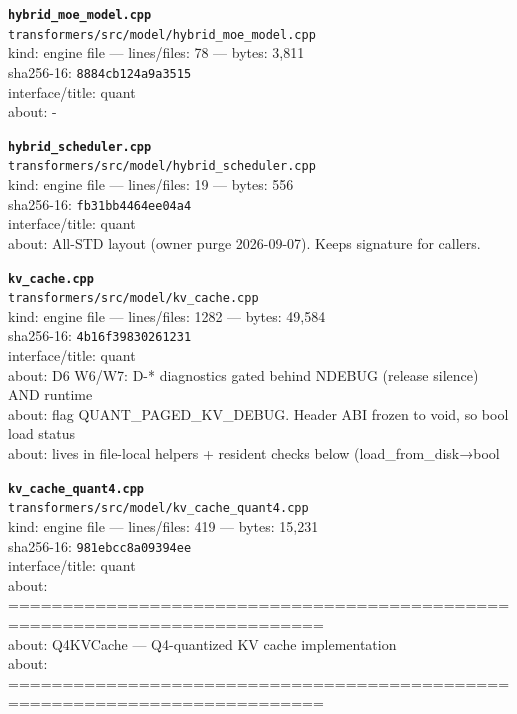 \noindent\textbf{\texttt{hybrid\_moe\_model.cpp}}\\
\texttt{transformers/src/model/hybrid\_moe\_model.cpp}\\
kind: engine file --- lines/files: 78 --- bytes: 3,811\\
sha256-16: \texttt{8884cb124a9a3515}\\
interface/title: quant\\
about: -\\
\vspace*{6.0pt}
\newpage

\noindent\textbf{\texttt{hybrid\_scheduler.cpp}}\\
\texttt{transformers/src/model/hybrid\_scheduler.cpp}\\
kind: engine file --- lines/files: 19 --- bytes: 556\\
sha256-16: \texttt{fb31bb4464ee04a4}\\
interface/title: quant\\
about: All-STD layout (owner purge 2026-09-07). Keeps signature for callers.\\
\vspace*{6.0pt}

\noindent\textbf{\texttt{kv\_cache.cpp}}\\
\texttt{transformers/src/model/kv\_cache.cpp}\\
kind: engine file --- lines/files: 1282 --- bytes: 49,584\\
sha256-16: \texttt{4b16f39830261231}\\
interface/title: quant\\
about: D6 W6/W7: D-* diagnostics gated behind NDEBUG (release silence) AND runtime\\
about: flag QUANT\_PAGED\_KV\_DEBUG. Header ABI frozen to void, so bool load status\\
about: lives in file-local helpers + resident checks below (load\_from\_disk→bool\\
\vspace*{6.0pt}

\noindent\textbf{\texttt{kv\_cache\_quant4.cpp}}\\
\texttt{transformers/src/model/kv\_cache\_quant4.cpp}\\
kind: engine file --- lines/files: 419 --- bytes: 15,231\\
sha256-16: \texttt{981ebcc8a09394ee}\\
interface/title: quant\\
about: ===========================================================================\\
about: Q4KVCache — Q4-quantized KV cache implementation\\
about: ===========================================================================\\
\vspace*{6.0pt}

